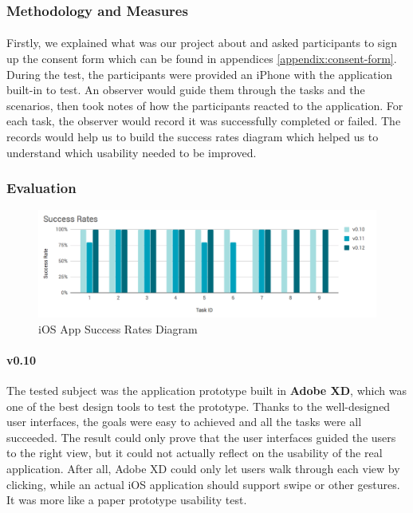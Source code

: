 \documentclass[12pt,a4paper]{article}
\begin{document}
        \subsubsection{Methodology and Measures}
          \paragraph{} Firstly, we explained what was our project about and asked participants to sign up the consent form which can be found in appendices \ref{appendix:consent-form}. During the test, the participants were provided an iPhone with the application built-in to test. An observer would guide them through the tasks and the scenarios, then took notes of how the participants reacted to the application. For each task, the observer would record it was successfully completed or failed. The records would help us to build the success rates diagram which helped us to understand which usability needed to be improved\cite{SuccessRates}. 

        
        \subsubsection{Evaluation}
          
          \begin{figure}[H]
            \centering
            \includegraphics[width=1\textwidth]{../assets/usability-test-success-rates.png}
            \caption{iOS App Success Rates Diagram}
            \label{fig:iOS App Success Rates Diagram}
          \end{figure}

          \paragraph{v0.10} The tested subject was the application prototype built in {\bf Adobe XD}, which was one of the best design tools to test the prototype. Thanks to the well-designed user interfaces, the goals were easy to achieved and all the tasks were all succeeded. The result could only prove that the user interfaces guided the users to the right view, but it could not actually reflect on the usability of the real application. After all, Adobe XD could only let users walk through each view by clicking, while an actual iOS application should support swipe or other gestures. It was more like a paper prototype usability test.
          
\end{document}

